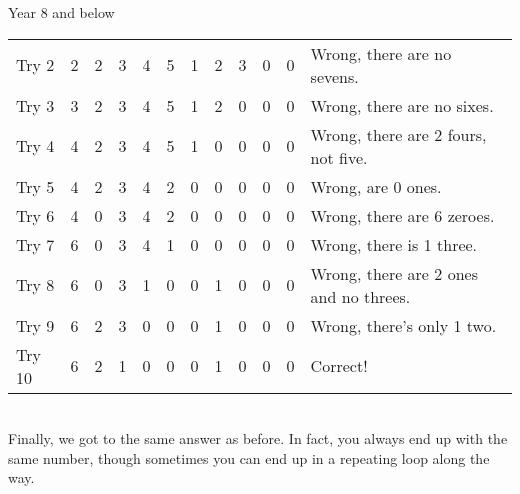 \begin{MyInnerBox}{Year 8 and below}
{\begin{MySolutionBox}
\begin{tabular}{l||c|c|c|c|c|c|c|c|c|c|l}
          Try 2 & 2 & 2 & 3 & 4 & 5 & 1 & 2 & 3 & 0 & 0 & Wrong, there are no sevens.\\
          Try 3 & 3 & 2 & 3 & 4 & 5 & 1 & 2 & 0 & 0 & 0 & Wrong, there are no sixes.\\
          Try 4 & 4 & 2 & 3 & 4 & 5 & 1 & 0 & 0 & 0 & 0 & Wrong, there are 2 fours, not five.\\
          Try 5 & 4 & 2 & 3 & 4 & 2 & 0 & 0 & 0 & 0 & 0 & Wrong, are \(0\) ones.\\
          Try 6 & 4 & 0 & 3 & 4 & 2 & 0 & 0 & 0 & 0 & 0 & Wrong, there are 6 zeroes.\\
          Try 7 & 6 & 0 & 3 & 4 & 1 & 0 & 0 & 0 & 0 & 0 & Wrong, there is 1 three.\\
          Try 8 & 6 & 0 & 3 & 1 & 0 & 0 & 1 & 0 & 0 & 0 & Wrong, there are 2 ones and no threes.\\
          Try 9 & 6 & 2 & 3 & 0 & 0 & 0 & 1 & 0 & 0 & 0 & Wrong, there's only 1 two.\\
          Try 10 & 6 & 2 & 1 & 0 & 0 & 0 & 1 & 0 & 0 & 0 & Correct!
        \end{tabular}\\
        Finally, we got to the same answer as before. In fact, you always end up with the same number, though sometimes you can end up in a repeating loop along the way.
      \end{MySolutionBox}
    }{}%
    \end{MyInnerBox}

